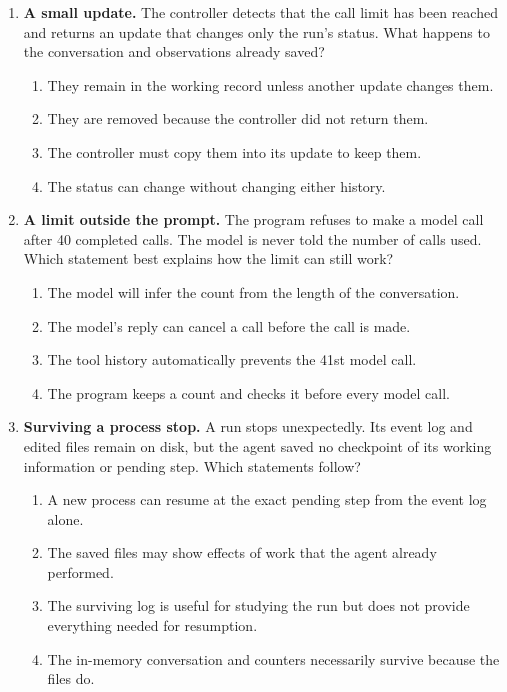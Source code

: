 \begin{enumerate}[start=11,itemsep=0.7\baselineskip]
\item\label{exercise:11} \begin{minipage}[t]{\linewidth}
\textbf{A small update.} The controller detects that the call limit has been reached and returns an update that changes only the run's status. What happens to the conversation and observations already saved?
\begin{enumerate}[label=\textnormal{(\Alph*)},leftmargin=*,itemsep=0pt]
\item They remain in the working record unless another update changes them.
\item They are removed because the controller did not return them.
\item The controller must copy them into its update to keep them.
\item The status can change without changing either history.
\end{enumerate}
\end{minipage}

\item\label{exercise:12} \begin{minipage}[t]{\linewidth}
\textbf{A limit outside the prompt.} The program refuses to make a model call after 40 completed calls. The model is never told the number of calls used. Which statement best explains how the limit can still work?
\begin{enumerate}[label=\textnormal{(\Alph*)},leftmargin=*,itemsep=0pt]
\item The model will infer the count from the length of the conversation.
\item The model's reply can cancel a call before the call is made.
\item The tool history automatically prevents the 41st model call.
\item The program keeps a count and checks it before every model call.
\end{enumerate}
\end{minipage}

\item\label{exercise:13} \begin{minipage}[t]{\linewidth}
\textbf{Surviving a process stop.} A run stops unexpectedly. Its event log and edited files remain on disk, but the agent saved no checkpoint of its working information or pending step. Which statements follow?
\begin{enumerate}[label=\textnormal{(\Alph*)},leftmargin=*,itemsep=0pt]
\item A new process can resume at the exact pending step from the event log alone.
\item The saved files may show effects of work that the agent already performed.
\item The surviving log is useful for studying the run but does not provide everything needed for resumption.
\item The in-memory conversation and counters necessarily survive because the files do.
\end{enumerate}
\end{minipage}


\end{enumerate}
